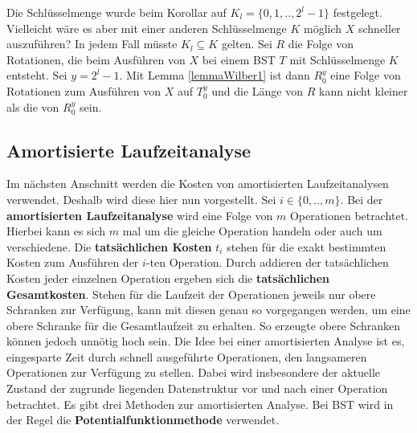 \documentclass[a4paper,12pt]{article}
\begin{document}
\noindent Die Schlüsselmenge  wurde beim Korollar auf ${K_l = \{0,1,..,2^l -1\}}$ festgelegt. Vielleicht wäre es aber mit einer anderen Schlüsselmenge $K$ möglich $X$ schneller auszuführen? In jedem Fall müsste $K_l \subseteq K$ gelten. Sei $R$ die Folge von Rotationen, die beim Ausführen von $X$ bei einem BST $T$ mit Schlüsselmenge $K$ entsteht. Sei $y = 2^l -1$. Mit Lemma \ref{lemmaWilber1} ist dann $R_0^y$ eine Folge von Rotationen zum Ausführen von $X$ auf $T_0^y$ und die Länge von $R$ kann nicht kleiner als die von $R_0^y$ sein. 



\subsection{Amortisierte Laufzeitanalyse}
Im nächsten Anschnitt werden die Kosten von amortisierten Laufzeitanalysen verwendet. Deshalb wird diese hier nun vorgestellt.
Sei $i \in \{0,..,m\}$. Bei der \textbf{amortisierten Laufzeitanalyse} wird eine Folge von $m$ Operationen betrachtet. Hierbei kann es sich $m$ mal um die gleiche Operation handeln oder auch um verschiedene. Die \textbf{tatsächlichen Kosten}  $t_i$ stehen für die exakt bestimmten Kosten zum Ausführen der $i$-ten Operation. Durch addieren der tatsächlichen Kosten jeder einzelnen Operation ergeben sich die \textbf{tatsächlichen Gesamtkosten}. Stehen für die Laufzeit der Operationen jeweils nur obere Schranken zur Verfügung, kann mit diesen genau so vorgegangen werden, um eine obere Schranke für die Gesamtlaufzeit zu erhalten. So erzeugte obere Schranken können jedoch unnötig hoch sein. Die Idee bei einer amortisierten Analyse ist es, eingesparte Zeit durch schnell ausgeführte Operationen, den langsameren Operationen zur Verfügung zu stellen. Dabei wird insbesondere der aktuelle Zustand der zugrunde liegenden Datenstruktur vor und nach einer Operation betrachtet. Es gibt drei Methoden zur amortisierten Analyse. Bei BST wird in der Regel die \textbf{Potentialfunktionmethode} verwendet.
\end{document}

